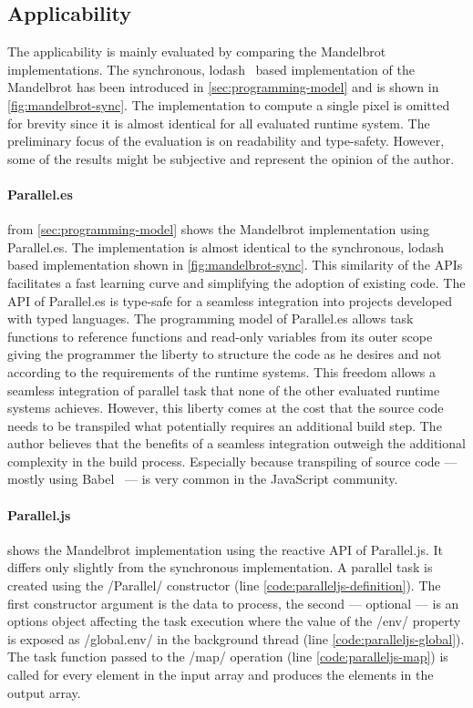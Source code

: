 \subsection{Applicability}
The applicability is mainly evaluated by comparing the Mandelbrot implementations. The synchronous, lodash~\cite{lodash} based implementation of the Mandelbrot has been introduced in \cref{sec:programming-model} and is shown in \cref{fig:mandelbrot-sync}. The implementation to compute a single pixel is omitted for brevity since it is almost identical for all evaluated runtime system. The preliminary focus of the evaluation is on readability and type-safety. However, some of the results might be subjective and represent the opinion of the author. 

\paragraph{Parallel.es}
 from \cref{sec:programming-model} shows the Mandelbrot implementation using Parallel.es. The implementation is almost identical to the synchronous, lodash~\cite{lodash} based implementation shown in \cref{fig:mandelbrot-sync}. This similarity of the APIs facilitates a fast learning curve and simplifying the adoption of existing code. The API of Parallel.es is type-safe for a seamless integration into projects developed with typed languages. The programming model of Parallel.es allows task functions to reference functions and read-only variables from its outer scope giving the programmer the liberty to structure the code as he desires and not according to the requirements of the runtime systems. This freedom allows a seamless integration of parallel task that none of the other evaluated runtime systems achieves. However, this liberty comes at the cost that the source code needs to be transpiled what potentially requires an additional build step. The author believes that the benefits of a seamless integration outweigh the additional complexity in the build process. Especially because transpiling of source code --- mostly using Babel~\cite{babel} --- is very common in the JavaScript community. 

\paragraph{Parallel.js}
 shows the Mandelbrot implementation using the reactive API of Parallel.js. It differs only slightly from the synchronous implementation. A parallel task is created using the \javascriptinline/Parallel/ constructor (line \ref{code:paralleljs-definition}). The first constructor argument is the data to process, the second --- optional --- is an options object affecting the task execution where the value of the \javascriptinline/env/ property is exposed as \javascriptinline/global.env/ in the background thread (line \ref{code:paralleljs-global}). The task function passed to the \javascriptinline/map/ operation (line \ref{code:paralleljs-map}) is called for every element in the input array and produces the elements in the output array.

